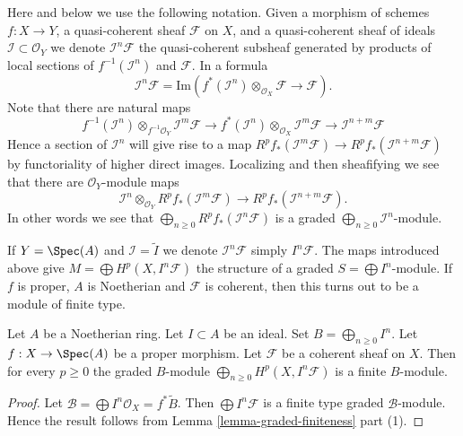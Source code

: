 \medskip\noindent
Here and below we use the following notation.
Given a morphism of schemes $f : X \to Y$, a quasi-coherent sheaf
$\mathcal{F}$ on $X$, and a quasi-coherent sheaf of ideals
$\mathcal{I} \subset \mathcal{O}_Y$ we denote
$\mathcal{I}^n\mathcal{F}$ the quasi-coherent subsheaf generated
by products of local sections of $f^{-1}(\mathcal{I}^n)$ and
$\mathcal{F}$. In a formula
$$
\mathcal{I}^n\mathcal{F}
=
\text{Im}\left(
f^*(\mathcal{I}^n) \otimes_{\mathcal{O}_X} \mathcal{F}
\longrightarrow
\mathcal{F}
\right).
$$
Note that there are natural maps
$$
f^{-1}(\mathcal{I}^n) \otimes_{f^{-1}\mathcal{O}_Y} \mathcal{I}^m\mathcal{F}
\longrightarrow
f^*(\mathcal{I}^n) \otimes_{\mathcal{O}_X} \mathcal{I}^m\mathcal{F}
\longrightarrow
\mathcal{I}^{n + m}\mathcal{F}
$$
Hence a section of $\mathcal{I}^n$ will give rise to a
map $R^pf_*(\mathcal{I}^m\mathcal{F}) \to
R^pf_*(\mathcal{I}^{n + m}\mathcal{F})$ by functoriality
of higher direct images. Localizing and then sheafifying we
see that there are $\mathcal{O}_Y$-module maps
$$
\mathcal{I}^n \otimes_{\mathcal{O}_Y} R^pf_*(\mathcal{I}^m\mathcal{F})
\longrightarrow
R^pf_*(\mathcal{I}^{n + m}\mathcal{F}).
$$
In other words we see that
$\bigoplus_{n \geq 0} R^pf_*(\mathcal{I}^n\mathcal{F})$
is a graded $\bigoplus_{n \geq 0} \mathcal{I}^n$-module.

\medskip\noindent
If $Y = \Spec(A)$ and $\mathcal{I} = \widetilde{I}$ we denote
$\mathcal{I}^n\mathcal{F}$ simply $I^n\mathcal{F}$. The maps
introduced above give $M = \bigoplus H^p(X, I^n\mathcal{F})$ the
structure of a graded $S = \bigoplus I^n$-module. If $f$ is proper,
$A$ is Noetherian and $\mathcal{F}$ is coherent, then this turns out
to be a module of finite type.

\begin{lemma}
\label{lemma-cohomology-powers-ideal-times-F}
Let $A$ be a Noetherian ring.
Let $I \subset A$ be an ideal.
Set $B = \bigoplus_{n \geq 0} I^n$.
Let $f : X \to \Spec(A)$ be a proper morphism.
Let $\mathcal{F}$ be a coherent sheaf on $X$.
Then for every $p \geq 0$ the graded $B$-module
$\bigoplus_{n \geq 0} H^p(X, I^n\mathcal{F})$ is
a finite $B$-module.
\end{lemma}

\begin{proof}
Let $\mathcal{B} = \bigoplus I^n\mathcal{O}_X = f^*\widetilde{B}$.
Then $\bigoplus I^n\mathcal{F}$ is a finite type
graded $\mathcal{B}$-module. Hence the result follows
from Lemma \ref{lemma-graded-finiteness} part (1).
\end{proof}

